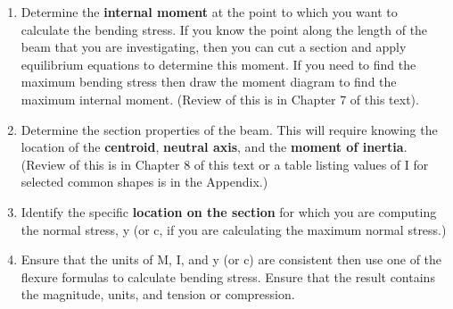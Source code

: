 \documentclass[
  letterpaper,
  DIV=11,
  numbers=noendperiod]{scrreprt}
\providecommand{\tightlist}{%
  \setlength{\itemsep}{0pt}\setlength{\parskip}{0pt}}\usepackage{longtable,booktabs,array}
\begin{document}
\begin{tcolorbox}[enhanced jigsaw, colbacktitle=quarto-callout-note-color!10!white, title={Step-by-step: Calculating Bending Stress}, coltitle=black, leftrule=.75mm, rightrule=.15mm, opacityback=0, breakable, colframe=quarto-callout-note-color-frame, left=2mm, arc=.35mm, colback=white, bottomrule=.15mm, bottomtitle=1mm, toptitle=1mm, titlerule=0mm, opacitybacktitle=0.6, toprule=.15mm]

\begin{enumerate}
\def\labelenumi{\arabic{enumi}.}
\tightlist
\item
  Determine the \textbf{internal moment} at the point to which you want
  to calculate the bending stress. If you know the point along the
  length of the beam that you are investigating, then you can cut a
  section and apply equilibrium equations to determine this moment. If
  you need to find the maximum bending stress then draw the moment
  diagram to find the maximum internal moment. (Review of this is in
  Chapter 7 of this text).
\item
  Determine the section properties of the beam. This will require
  knowing the location of the \textbf{centroid}, \textbf{neutral axis},
  and the \textbf{moment of inertia}. (Review of this is in Chapter 8 of
  this text or a table listing values of I for selected common shapes is
  in the Appendix.)
\item
  Identify the specific \textbf{location on the section} for which you
  are computing the normal stress, y (or c, if you are calculating the
  maximum normal stress.)
\item
  Ensure that the units of M, I, and y (or c) are consistent then use
  one of the flexure formulas to calculate bending stress. Ensure that
  the result contains the magnitude, units, and tension or compression.
\end{enumerate}

\end{tcolorbox}
\end{document}
